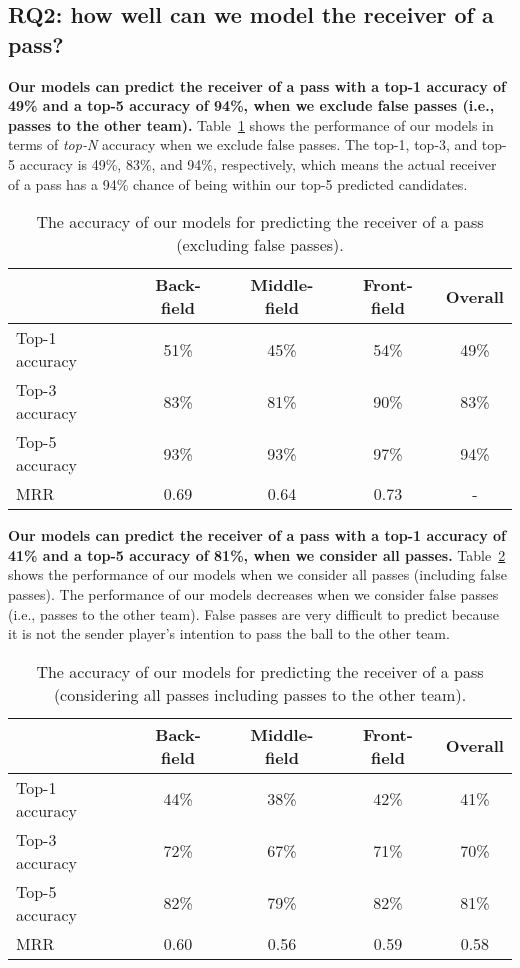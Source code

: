 \subsection{RQ2: how well can we model the receiver of a pass?}\label{RQ2-results}

\textbf{Our models can predict the receiver of a pass with a top-1 accuracy of 49\% and a top-5 accuracy of 94\%, when we exclude false passes (i.e., passes to the other team).}
Table~\ref{tab:performance-accurate-passes} shows the performance of our models in terms of \textit{top-N} accuracy when we exclude false passes. 
The top-1, top-3, and top-5 accuracy is 49\%, 83\%, and 94\%, respectively, which means the actual receiver of a pass has a 94\% chance of being within our top-5 predicted candidates.

\begin{table}[!t]
\caption{The accuracy of our models for predicting the receiver of a pass (excluding false passes).}
\centering
\begin{tabular}{lcccc}
  \hline
  & Back-field & Middle-field & Front-field & Overall \\
  \hline
  Top-1 accuracy & 51\% & 45\% & 54\% & 49\% \\
  Top-3 accuracy & 83\% & 81\% & 90\% & 83\% \\
  Top-5 accuracy & 93\% & 93\% & 97\% & 94\% \\
  MRR & 0.69 & 0.64 & 0.73 & - \\
  \hline
\end{tabular}
\label{tab:performance-accurate-passes}
\end{table}

\textbf{Our models can predict the receiver of a pass with a top-1 accuracy of 41\% and a top-5 accuracy of 81\%, when we consider all passes.}
Table~\ref{tab:performance-all-passes} shows the performance of our models when we consider all passes (including false passes). 
The performance of our models decreases when we consider false passes (i.e., passes to the other team). 
False passes are very difficult to predict because it is not the sender player's intention to pass the ball to the other team. 

\begin{table}[!t]
\caption{The accuracy of our models for predicting the receiver of a pass (considering all passes including passes to the other team).}
\centering
\begin{tabular}{lcccc}
  \hline
  & Back-field & Middle-field & Front-field & Overall \\
  \hline
  Top-1 accuracy & 44\% & 38\% & 42\% & 41\% \\
  Top-3 accuracy & 72\% & 67\% & 71\% & 70\% \\
  Top-5 accuracy & 82\% & 79\% & 82\% & 81\% \\
  MRR & 0.60 & 0.56 & 0.59 & 0.58 \\

  \hline
\end{tabular}
\label{tab:performance-all-passes}
\end{table}

